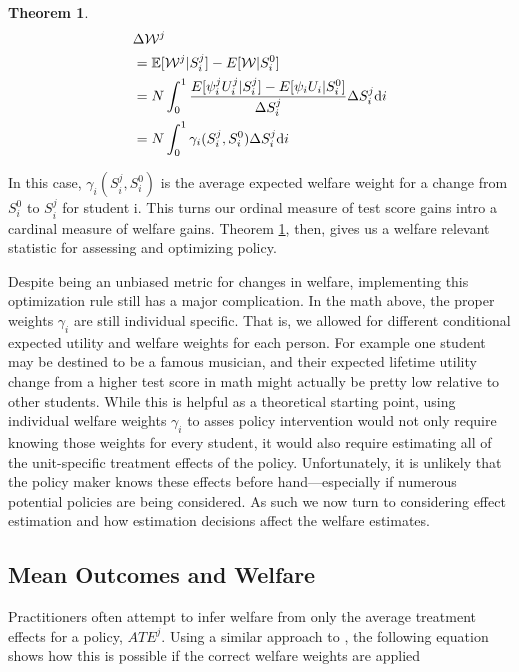 \documentclass[12pt]{article}
\theoremstyle{definition}
\theoremstyle{definition}
\theoremstyle{definition}
\theoremstyle{definition}
\newtheorem{thm}{Theorem}
\begin{document}
    \begin{thm}
    \label{def_welfare_change}
    \begin{align}
           &  \Delta \mathcal{W}^j \\
           & = \mathbb{E}[\mathcal{W}^j|S_i^j] - E[\mathcal{W}|S_i^0]  \\
           &  = N \int_0^1 \frac{E[\psi^j_i U^j_i |S_i^j] - E[\psi_i U_i |S_i^0]}{\Delta S^j_i} \Delta S^j_i\text{d}i \\ 
          &   = N \int_0^1 \gamma_i(S_i^j, S_i^0) \Delta S^j_i \text{d}i
    \end{align}
    \end{thm}

   
 
    In this case, $\gamma_i(S_i^j, S_i^0) $ is the average expected welfare weight for a change from $S_i^0$ to $S_i^j$ for student i. This turns our ordinal measure of test score gains intro a cardinal measure of welfare gains. Theorem \ref{def_welfare_change}, then, gives us a welfare relevant statistic for assessing and optimizing policy.

 Despite being an unbiased metric for changes in welfare, implementing this optimization rule still has a major complication. In the math above, the proper weights  $\gamma_i$ are still individual specific. That is, we allowed for different conditional expected utility and welfare weights for each person. For example one student may be destined to be a famous musician, and their expected lifetime utility change from a higher test score in math might actually be pretty low relative to other students. While this is helpful as a theoretical starting point, using individual welfare weights  $\gamma_i$ to asses policy intervention would not only require knowing those weights for every student, it would also require estimating all of the unit-specific treatment effects of the policy. Unfortunately, it is unlikely that the policy maker knows these effects before hand---especially if numerous potential policies are being considered. As such we now turn to considering effect estimation and how estimation decisions affect the welfare estimates.
    
    
    \subsection{Mean Outcomes and Welfare}

    Practitioners often attempt to infer welfare from only the average treatment effects for a policy, $ATE^j$. Using a similar approach to  \cite{Keyser_2020}, the following equation shows how this is possible if the correct welfare weights are applied
\end{document}
